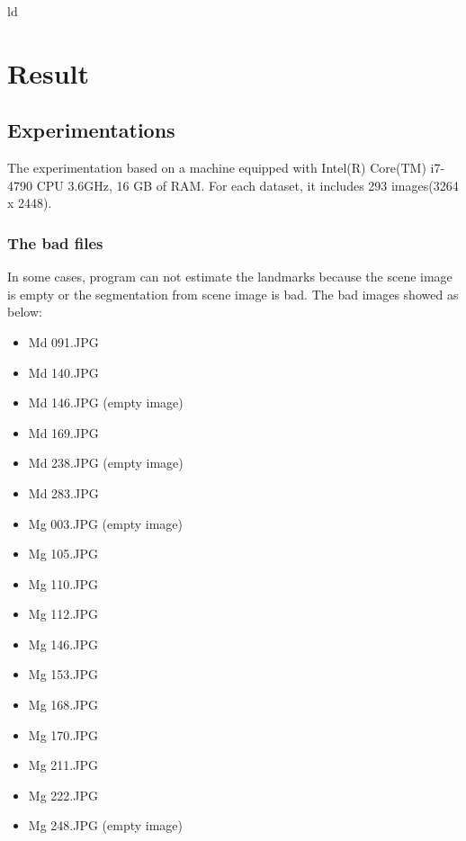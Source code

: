 ld\chapter{Result}
\section{Experimentations}
The experimentation based on a machine equipped with Intel(R) Core(TM) i7-4790 CPU 3.6GHz, 16 GB of RAM. For each dataset, it includes 293 images(3264 x 2448). 
\subsection{The bad files}
In some cases, program can not estimate the landmarks because the scene image is empty or the segmentation from scene image is bad. The bad images showed as below:
\begin{multicols}{2}
\begin{itemize}
\item Md 091.JPG
\item Md 140.JPG
\item Md 146.JPG (empty image)
\item Md 169.JPG
\item Md 238.JPG (empty image)
\item Md 283.JPG
\item Mg 003.JPG (empty image)
\item Mg 105.JPG
\item Mg 110.JPG
\item Mg 112.JPG
\item Mg 146.JPG
\item Mg 153.JPG
\item Mg 168.JPG
\item Mg 170.JPG
\item Mg 211.JPG
\item Mg 222.JPG
\item Mg 248.JPG (empty image)
\end{itemize} 
\end{multicols}
